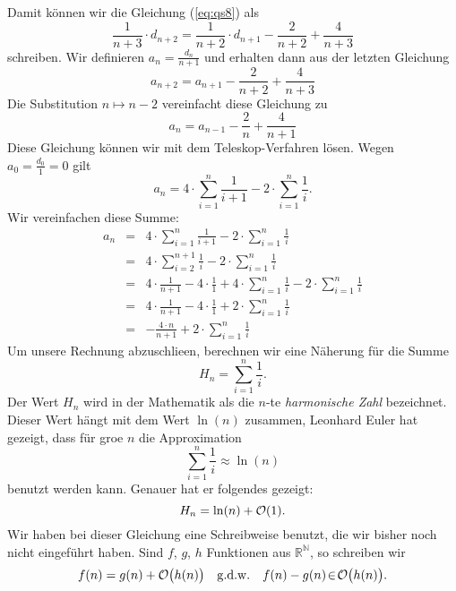 Damit k\"onnen wir die Gleichung (\ref{eq:qs8}) als 
\begin{equation}
  \label{eq:qs9}
 \frac{1}{n+3} \cdot d_{n+2} = \frac{1}{n+2}\cdot d_{n+1} - \frac{2}{n+2} + \frac{4}{n+3}  
\end{equation}
schreiben.  Wir definieren $\displaystyle a_n = \frac{d_n}{n+1}$ und erhalten dann aus der
letzten Gleichung 
\[ a_{n+2} = a_{n+1} - \frac{2}{n+2} + \frac{4}{n+3} \]
Die Substitution $n \mapsto n-2$ vereinfacht diese Gleichung zu 
\begin{equation}
  \label{eq:qs10}
 a_{n} = a_{n-1} - \frac{2}{n} + \frac{4}{n+1}  
\end{equation}
Diese Gleichung k\"onnen wir mit dem Teleskop-Verfahren l\"osen.  Wegen $a_0 = \frac{d_0}{1} = 0$ gilt 
\begin{equation}
  \label{eq:qs11}
 a_{n} = 4 \cdot \sum_{i=1}^n \frac{1}{i+1} - 2 \cdot \sum_{i=1}^n \frac{1}{i}.  
\end{equation}
Wir vereinfachen diese Summe:
\[
\begin{array}{lcl}
 a_{n} & = & \displaystyle 4 \cdot \sum_{i=1}^n \frac{1}{i+1} - 2 \cdot \sum_{i=1}^n \frac{1}{i} \\[0.5cm]
       & = & \displaystyle 4 \cdot \sum_{i=2}^{n+1} \frac{1}{i} - 2 \cdot \sum_{i=1}^n \frac{1}{i} \\[0.5cm]
       & = & \displaystyle 4 \cdot \frac{1}{n+1} - 4 \cdot \frac{1}{1} + 4 \cdot \sum_{i=1}^{n} \frac{1}{i} - 2 \cdot \sum_{i=1}^n \frac{1}{i} \\[0.5cm]
       & = & \displaystyle 4 \cdot \frac{1}{n+1} - 4 \cdot \frac{1}{1} + 2 \cdot \sum_{i=1}^{n} \frac{1}{i}  \\[0.5cm]
       & = & \displaystyle - \frac{4 \cdot n}{n+1}  + 2 \cdot \sum_{i=1}^{n} \frac{1}{i}  
\end{array}
\]
Um unsere Rechnung abzuschlie\3en, berechnen wir eine N\"aherung f\"ur die Summe 
\[ H_n = \sum\limits_{i=1}^{n}\frac{1}{i}.\]
Der Wert $H_n$ wird in der Mathematik als die $n$-te \emph{harmonische Zahl} bezeichnet.
Dieser Wert h\"angt mit dem Wert $\ln(n)$ zusammen, Leonhard Euler hat gezeigt, dass f\"ur
gro\3e $n$ die Approximation
\[ \sum\limits_{i=1}^n \frac{1}{i} \approx \ln(n)  \]
benutzt werden kann.  Genauer hat er folgendes gezeigt:
\[ H_n = \ln(n) + \mathcal{O}(1). \]
Wir haben bei dieser Gleichung eine Schreibweise benutzt, die wir bisher noch nicht
eingef\"uhrt haben.  Sind $f$, $g$, $h$ Funktionen aus $\mathbb{R}^\mathbb{N}$, so schreiben
wir 
\[ f(n) = g(n) + \mathcal{O}\bigl(h(n)\bigr) \quad \mathrm{g.d.w.} \quad
   f(n) - g(n) \!\in\! \mathcal{O}\bigl(h(n)\bigr). 
\]
